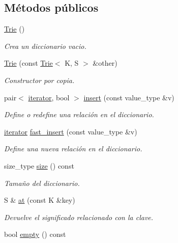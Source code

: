 \subsection*{Métodos públicos}
\begin{DoxyCompactItemize}
\item 
\hyperlink{classTrie_a41f0865fb41246aa707139eba04769d7}{Trie} ()
\begin{DoxyCompactList}\small\item\em Crea un diccionario vacio. \end{DoxyCompactList}\item 
\hyperlink{classTrie_a633ac90cdec93ea8b9e7e53df703e720}{Trie} (const \hyperlink{classTrie}{Trie}$<$ K, S $>$ \&other)
\begin{DoxyCompactList}\small\item\em Constructor por copia. \end{DoxyCompactList}\item 
pair$<$ \hyperlink{classTrie_1_1iterator}{iterator}, bool $>$ \hyperlink{classTrie_ac9e770501743cdddadb5337c2afd6bd3}{insert} (const value\-\_\-type \&v)
\begin{DoxyCompactList}\small\item\em Define o redefine una relación en el diccionario. \end{DoxyCompactList}\item 
\hyperlink{classTrie_1_1iterator}{iterator} \hyperlink{classTrie_a5e77c556d9ea44ad58e7720579cf6356}{fast\-\_\-insert} (const value\-\_\-type \&v)
\begin{DoxyCompactList}\small\item\em Define una nueva relación en el diccionario. \end{DoxyCompactList}\item 
size\-\_\-type \hyperlink{classTrie_ad028c84aa33e37835b7ca28ed3378e98}{size} () const 
\begin{DoxyCompactList}\small\item\em Tamaño del diccionario. \end{DoxyCompactList}\item 
S \& \hyperlink{classTrie_ac13ebb92558e11324856ad6f54cf03c4}{at} (const K \&key)
\begin{DoxyCompactList}\small\item\em Devuelve el significado relacionado con la clave. \end{DoxyCompactList}\item 
bool \hyperlink{classTrie_ad010dfe65cae2e4fac78ec36b76aa452}{empty} () const 

\end{DoxyCompactItemize}
